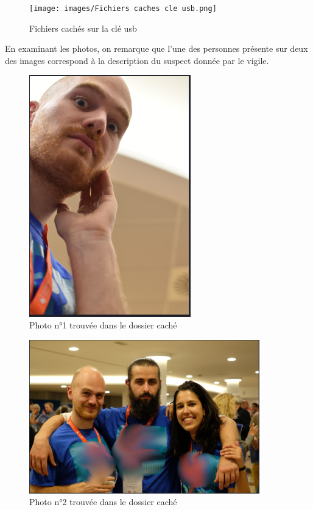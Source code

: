 \documentclass[a4paper]{article}
\begin{document}
\begin{figure}[H]
    \centering
    \texttt{[image: images/Fichiers caches cle usb.png]}
    \caption{Fichiers cachés sur la clé usb}
    \label{hidden_files}
\end{figure}

En examinant les photos, on remarque que l’une des personnes présente sur deux des images correspond à la description du suspect donnée par le vigile.

    
\begin{figure}[H]
    \centering
    \includegraphics[width=7cm]{images/Photo 2 cle usb.png}
    \caption{Photo n°1 trouvée dans le dossier caché}
    \label{first_picture}
\end{figure}
    
\begin{figure}[H]
    \centering
    \includegraphics[width=10cm]{images/Photo 3 cle usb.png}
    \caption{Photo n°2 trouvée dans le dossier caché}
    \label{second_picture}
\end{figure}
\end{document}
